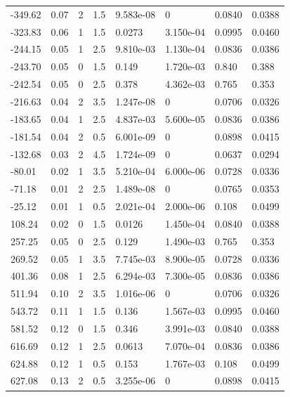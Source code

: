\documentclass[preview]{standalone}
\begin{document}
{{\begin{tabular}{L{1.2cm}C{1.2cm} C{0.3cm}C{0.5cm} C{1.4cm}C{1.4cm} C{1.4cm}C{1.4cm}}
  -349.62  &  0.07  & 2     & 1.5 &  9.583e-08  & 0  & 0.0840 &  0.0388   \\ 
  -323.83  &  0.06  & 1     & 1.5 &  0.0273  & 3.150e-04  & 0.0995 &  0.0460   \\ 
  -244.15  &  0.05  & 1     & 2.5 &  9.810e-03  & 1.130e-04  & 0.0836 &  0.0386   \\ 
  -243.70  &  0.05  & 0     & 1.5 &  0.149  & 1.720e-03  & 0.840 &  0.388   \\ 
  -242.54  &  0.05  & 0     & 2.5 &  0.378  & 4.362e-03  & 0.765 &  0.353   \\ 
  -216.63  &  0.04  & 2     & 3.5 &  1.247e-08  & 0  & 0.0706 &  0.0326   \\ 
  -183.65  &  0.04  & 1     & 2.5 &  4.837e-03  & 5.600e-05  & 0.0836 &  0.0386   \\ 
  -181.54  &  0.04  & 2     & 0.5 &  6.001e-09  & 0  & 0.0898 &  0.0415   \\ 
  -132.68  &  0.03  & 2     & 4.5 &  1.724e-09  & 0  & 0.0637 &  0.0294   \\ 
  -80.01  &  0.02  & 1     & 3.5 &  5.210e-04  & 6.000e-06  & 0.0728 &  0.0336   \\ 
  -71.18  &  0.01  & 2     & 2.5 &  1.489e-08  & 0  & 0.0765 &  0.0353   \\ 
  -25.12  &  0.01  & 1     & 0.5 &  2.021e-04  & 2.000e-06  & 0.108 &  0.0499   \\ 
  108.24  &  0.02  & 0     & 1.5 &  0.0126  & 1.450e-04  & 0.0840 &  0.0388   \\ 
  257.25  &  0.05  & 0     & 2.5 &  0.129  & 1.490e-03  & 0.765 &  0.353   \\ 
  269.52  &  0.05  & 1     & 3.5 &  7.745e-03  & 8.900e-05  & 0.0728 &  0.0336   \\ 
  401.36  &  0.08  & 1     & 2.5 &  6.294e-03  & 7.300e-05  & 0.0836 &  0.0386   \\ 
  511.94  &  0.10  & 2     & 3.5 &  1.016e-06  & 0  & 0.0706 &  0.0326   \\ 
  543.72  &  0.11  & 1     & 1.5 &  0.136  & 1.567e-03  & 0.0995 &  0.0460   \\ 
  581.52  &  0.12  & 0     & 1.5 &  0.346  & 3.991e-03  & 0.0840 &  0.0388   \\ 
  616.69  &  0.12  & 1     & 2.5 &  0.0613  & 7.070e-04  & 0.0836 &  0.0386   \\ 
  624.88  &  0.12  & 1     & 0.5 &  0.153  & 1.767e-03  & 0.108 &  0.0499   \\ 
  627.08  &  0.13  & 2     & 0.5 &  3.255e-06  & 0  & 0.0898 &  0.0415   \\ 

\end{tabular}}}
\end{document}
